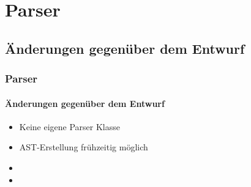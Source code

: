 \section{Parser}

\subsection{Änderungen gegenüber dem Entwurf}
\begin{frame}
\frametitle{Parser}
\framesubtitle{Änderungen gegenüber dem Entwurf}
\begin{itemize}
	\item<+-> Keine eigene Parser Klasse
	\item<+-> AST-Erstellung frühzeitig möglich
	\item<+-> 
	\item<+-> 
\end{itemize}
\end{frame}

